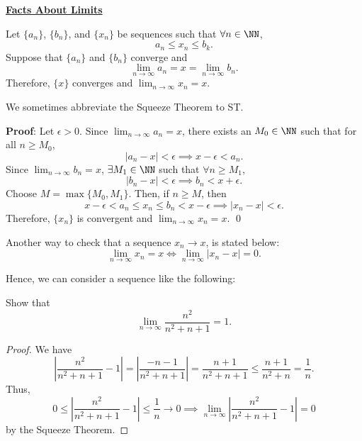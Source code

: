 

\noindent\underline{\textbf{Facts About Limits}}

\begin{theorem}
Let $\{a_n\}$, $\{b_n\}$, and $\{x_n\}$ be sequences such that $\forall n\in \NN$,
\[
a_n \leq x_n \leq b_k.
\]
Suppose that $\{a_n\}$ and $\{b_n\}$ converge and 
\[
\lim_{n\to \infty}a_n = x = \lim_{n\to \infty}b_n.
\]
Therefore, $\{x\}$ converges and $\lim_{n\to \infty}x_n = x$.
\end{theorem}
\begin{remark}
We sometimes abbreviate the Squeeze Theorem to ST.
\end{remark}

\textbf{Proof}: Let $\epsilon>0$. Since $\lim_{n\to \infty} a_n = x$, there exists an $M_0\in \NN$ such that for all $n\geq M_0$, 
\[
|a_n-x| <\epsilon \implies x-\epsilon <a_n.
\]
Since $\lim_{n\to \infty}b_n = x$, $\exists M_1 \in \NN$ such that $\forall n\geq M_1$, 
\[
|b_n - x| < \epsilon \implies b_n < x+\epsilon.
\]
Choose $M = \max\{M_0, M_1\}$. Then, if $n\geq M$, then
\[
x-\epsilon < a_n \leq x_n \leq b_n < x-\epsilon \implies |x_n-x|<\epsilon.
\]
Therefore, $\{x_n\}$ is convergent and $\lim_{n\to \infty}x_n = x.$
\qed

\begin{theorem}
Another way to check that a sequence $x_n\to x$, is stated below:
\[
\lim_{n\to \infty}x_n = x \iff \lim_{n\to \infty}|x_n-x| = 0.
\]
\end{theorem}

Hence, we can consider a sequence like the following:
\begin{example}
Show that 
\[
\lim_{n\to \infty} \frac{n^2}{n^2+n+1} = 1.
\]
\end{example}
\begin{proof}
We have 
\[
\left|\frac{n^2}{n^2 + n + 1} - 1\right| = \left|\frac{-n-1}{n^2+n+1}\right| = \frac{n+1}{n^2+n+1} \leq \frac{n+1}{n^2+n} = \frac{1}{n}.
\] 
Thus,
\[
0 \leq \left|\frac{n^2}{n^2 + n + 1} - 1\right| \leq \frac{1}{n}\to 0\implies \lim_{n\to \infty} \left|\frac{n^2}{n^2 + n + 1} - 1\right| = 0
\]
by the Squeeze Theorem.
\end{proof}

